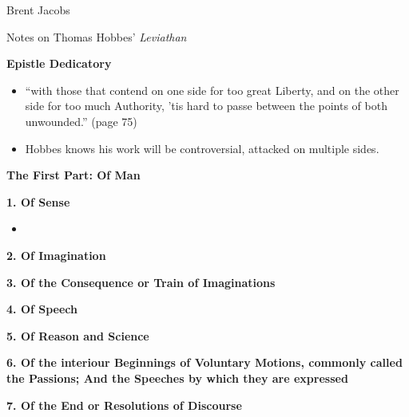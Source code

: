 \documentclass[11pt]{article}
\newcommand{\sectiontitle}[1]{{\Large {\bfseries #1}}}
\newcommand{\chapter}[1]{{\bfseries #1}}
\newcommand{\p}{page }
\begin{document}
\hfill Brent Jacobs

{\Large Notes on Thomas Hobbes' \textsl{Leviathan}} 

\sectiontitle{Epistle Dedicatory}
\begin{itemize}
\item
    ``with those that contend on one side for too great Liberty,
    and on the other side for too much Authority, 'tis hard
    to passe between the points of both unwounded.'' (\p 75)
\item
    Hobbes knows his work will be controversial, attacked on
    multiple sides.
\end{itemize}

\sectiontitle{The First Part: Of Man}

\chapter{1. Of Sense}
\begin{itemize}
\item
\end{itemize}

\chapter{2. Of Imagination}

\chapter{3. Of the Consequence or Train of Imaginations}

\chapter{4. Of Speech}

\chapter{5. Of Reason and Science}

\chapter{6. Of the interiour Beginnings of Voluntary Motions, commonly
called the Passions; And the Speeches by which they are expressed}

\chapter{7. Of the End or Resolutions of Discourse}
\end{document}
